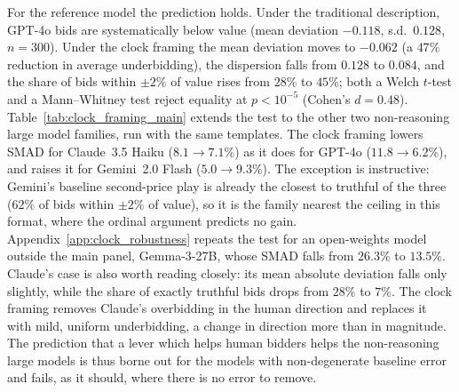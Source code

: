 \documentclass{article} %
\newif\ifmarkrev
\newcommand{\rev}[1]{\ifmarkrev\begingroup\color{red}#1\endgroup\else#1\fi}
\begin{document}
\rev{For the reference model the prediction holds. Under the traditional description, GPT-4o bids are systematically below value (mean deviation $-0.118$, s.d.\ $0.128$, $n=300$). Under the clock framing the mean deviation moves to $-0.062$ (a $47\%$ reduction in average underbidding), the dispersion falls from $0.128$ to $0.084$, and the share of bids within $\pm 2\%$ of value rises from $28\%$ to $45\%$; both a Welch $t$-test and a Mann--Whitney test reject equality at $p<10^{-5}$ (Cohen's $d=0.48$). Table~\ref{tab:clock_framing_main} extends the test to the other two non-reasoning large model families, run with the same templates. The clock framing lowers SMAD for Claude~3.5 Haiku ($8.1\to7.1\%$) as it does for GPT-4o ($11.8\to6.2\%$), and raises it for Gemini~2.0 Flash ($5.0\to9.3\%$). The exception is instructive: Gemini's baseline second-price play is already the closest to truthful of the three ($62\%$ of bids within $\pm 2\%$ of value), so it is the family nearest the ceiling in this format, where the ordinal argument predicts no gain. Appendix~\ref{app:clock_robustness} repeats the test for an open-weights model outside the main panel, Gemma-3-27B, whose SMAD falls from $26.3\%$ to $13.5\%$. Claude's case is also worth reading closely: its mean absolute deviation falls only slightly, while the share of exactly truthful bids drops from $28\%$ to $7\%$. The clock framing removes Claude's overbidding in the human direction and replaces it with mild, uniform underbidding, a change in direction more than in magnitude. The prediction that a lever which helps human bidders helps the non-reasoning large models is thus borne out for the models with non-degenerate baseline error and fails, as it should, where there is no error to remove.}


\begin{table}[htbp]
\centering
\small
\rev{\resizebox{\linewidth}{!}{}}
\caption{\rev{\textbf{Clock framing of the second-price sealed-bid auction across the three non-reasoning large model families.} SMAD (\%), mean scaled deviation $(b-v)/\mathbb{E}[b^\star]$, and the share of bids within $\pm2\%$ of value under the baseline description (two pooled runs of the standard description) and under the clock framing; $p$-values are Mann--Whitney tests against the same model's baseline. The final column records whether the sign of the effect matches the human evidence of \citet{breitmoser2022obviousness}: $\surd$ if SMAD falls with $p<0.05$, $\times$ otherwise.}}
\label{tab:clock_framing_main}
\end{table}
\end{document}
